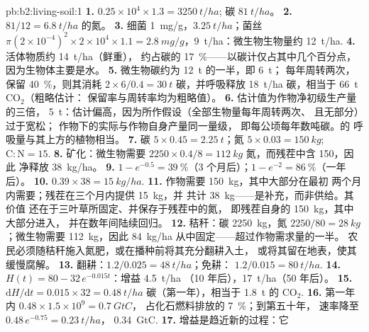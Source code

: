 \begin{solution}{pb:b2:living-soil:1}
\textbf{1.} $0.25\times 10^{4}\times 1.3 = \qty{3250}{t/ha}$;
碳 $\qty{81}{t/ha}$。
\textbf{2.} $81/12 = \qty{6.8}{t/ha}$ 的氮。
\textbf{3.} 细菌 \qty{1}{mg/g}，$\qty{3.25}{t/ha}$；菌丝
$\pi(2\times 10^{-4})^{2}\times 2\times 10^{4}\times 1.1 =
\qty{2.8}{mg/g}$，\qty{9}{t/ha}：微生物生物量约
\qty{12}{t/ha}.
\textbf{4.} 活体物质约 \qty{14}{t/ha}（鲜重），
约占碳的 \qty{17}{\%}——以碳计仅占其中几个百分点，
因为生物体主要是水。
\textbf{5.} 微生物碳约为 \qty{12}{t} 的一半，即 \qty{6}{t}；
每年周转两次，保留 \qty{40}{\%}，则其消耗
$2\times 6/0.4 = \qty{30}{t}$ 碳，并呼吸释放 \qty{18}{t/ha}
碳，相当于 \qty{66}{t} $\mathrm{CO_2}$（粗略估计：
保留率与周转率均为粗略值）。
\textbf{6.} 估计值为作物净初级生产量的三倍，
\qty{5}{t}：估计偏高，因为所作假设（全部生物量每年周转两次、
且无部分）过于宽松；
作物下的实际与作物自身产量同一量级，
即每公顷每年数吨碳。的
呼吸量与其上方的植物相当。
\textbf{7.} 碳 $5\times 0.45 = \qty{2.25}{t}$；氮 $5\times
0.03 = \qty{150}{kg}$; $\mathrm{C:N} = 15$.
\textbf{8.} 矿化：微生物需要 $2250\times 0.4/8 =
\qty{112}{kg}$ 氮，而残茬中含 150，因此
净释放 \qty{38}{kg/ha}。
\textbf{9.} $1 - e^{-0.5} = \qty{39}{\%}$（3 个月后）；$1 - e^{-2}
= \qty{86}{\%}$（一年后）。
\textbf{10.} $0.39\times 38 = \qty{15}{kg/ha}$.
\textbf{11.} 作物需要 \qty{150}{kg}，其中大部分在最初
两个月内需要；残茬在三个月内提供 \qty{15}{kg}，并
共计 \qty{38}{kg}——是补充，而非供给。其价值
还在于三叶草所固定、并保存于残茬中的氮，
即残茬自身的 \qty{150}{kg}，其中大部分进入，
并在数年间陆续回归。
\textbf{12.} 秸秆：碳 \qty{2250}{kg}，氮 $2250/80 =
\qty{28}{kg}$；微生物需要 \qty{112}{kg}，因此 \qty{84}{kg/ha}
从中固定——超过作物需求量的一半。
农民必须随秸秆施入氮肥，或在播种前将其充分翻耕入土，
或将其留在地表，使其缓慢腐解。
\textbf{13.} 翻耕：$1.2/0.025 = \qty{48}{t/ha}$；免耕：
$1.2/0.015 = \qty{80}{t/ha}$.
\textbf{14.} $H(t) = 80 - 32\,e^{-0.015t}$：增益 \qty{4.5}{t/ha}
（10 年后），\qty{17}{t/ha}（50 年后）。
\textbf{15.} $\mathrm{d}H/\mathrm{d}t = 0.015\times 32 =
\qty{0.48}{t/ha}$ 碳（第一年），相当于 \qty{1.8}{t} 的
$\mathrm{CO_2}$.
\textbf{16.} 第一年内 $0.48\times 1.5\times 10^{9} = \qty{0.7}{GtC}$，
占化石燃料排放的 \qty{7}{\%}；到第五十年，
速率降至 $0.48\,e^{-0.75} = \qty{0.23}{t/ha}$，
\qty{0.34}{GtC}.
\textbf{17.} 增益是趋近新的过程：它

\end{solution}
